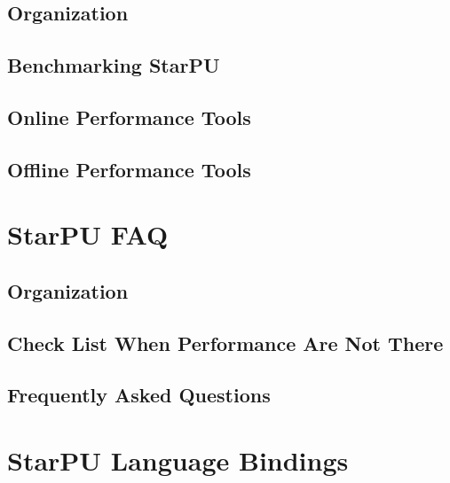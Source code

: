 \chapter{Organization}
\label{IntroPerformances}
\hypertarget{IntroPerformances}{}


\chapter{Benchmarking StarPU}
\label{BenchmarkingStarPU}
\hypertarget{BenchmarkingStarPU}{}


\chapter{Online Performance Tools}
\label{OnlinePerformanceTools}
\hypertarget{OnlinePerformanceTools}{}


\chapter{Offline Performance Tools}
\label{OfflinePerformanceTools}
\hypertarget{OfflinePerformanceTools}{}


\part{StarPU FAQ}

\chapter{Organization}
\label{IntroFAQ}
\hypertarget{IntroFAQ}{}


\chapter{Check List When Performance Are Not There}
\label{CheckListWhenPerformanceAreNotThere}
\hypertarget{CheckListWhenPerformanceAreNotThere}{}


\chapter{Frequently Asked Questions}
\label{FrequentlyAskedQuestions}
\hypertarget{FrequentlyAskedQuestions}{}


\part{StarPU Language Bindings}

